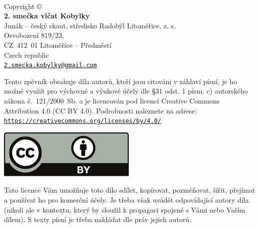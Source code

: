 \pagestyle{empty}
\begin{center}
\ \\
\vspace{20mm}
Copyright \copyright{} \the\year\\\vspace{3mm}
{\Large\bfseries 2. smečka vlčat Kobylky} \\\vspace{3mm}
Junák -- český skaut, středisko Radobýl Litoměřice, z. s.\\
Osvobození 819/23,\\
CZ~412~01 Litoměřice -- Předměstí\\
Czech republic\\
\href{mailto:2.smecka.kobylky@gmail.com}{\tt{}2.smecka.kobylky@gmail.com}\\\vspace{10mm}
\begin{minipage}{.7\textwidth}
\small
Tento zpěvník obsahuje díla autorů, kteří jsou citováni v záhlaví písní, je ho možné využít pro výchovné a výukové účely dle §31 odst. 1 písm. c) autorského zákona \mbox{č. 121/2000 Sb.} a je licencován pod licencí Creative Commons Attribution 4.0 (CC BY 4.0). Podrobnosti naleznete na adrese:\\
\href{https://creativecommons.org/licenses/by/4.0/}{\tt{}https://creativecommons.org/licenses/by/4.0/}\
\begin{center}
\includegraphics{cc_by.pdf}
\end{center}
Tato licence Vám umožňuje toto dílo sdílet, kopírovat, pozměňovat, šířit, přejímat a používat ho pro komerční účely. Je třeba však uvádět odpovídající autory díla (nikoli ale v kontextu, který by sloužil k propagaci spojené s Vámi nebo Vaším dílem). S texty písní je třeba nakládat dle práv jejich autorů.
\end{minipage}
\end{center}
\restoregeometry

